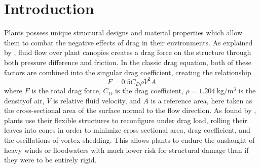 \section{Introduction}


Plants possess unique structural designs and material properties which allow them to combat the negative effects of drag in their environments. As explained by \citep{delangre,2008}, fluid flow over plant canopies creates a drag force on the structure through both pressure difference and friction. In the classic drag equation, both of these factors are combined into the singular drag coefficient, creating the relationship
\begin{equation}
F=0.5 C_D \rho V^2 A
\end{equation}
where $F$ is the total drag force, $C_D$ is the drag coefficient, $\rho=\SI{1.204}{\kilo\gram\per\meter\cubed}$ is the densityof air, $V$ is relative fluid velocity, and $A$ is a reference area, here taken as the cross-sectional area of the surface normal to the flow direction. As found by \citep{vogel,1989}, plants use their flexible structures to reconfigure under drag load, rolling their leaves into cones in order to minimize cross sectional area, drag coefficient, and the oscillations of vortex shedding. This allows plants to endure the onslaught of heavy winds or floodwaters with much lower risk for structural damage than if they were to be entirely rigid. 

